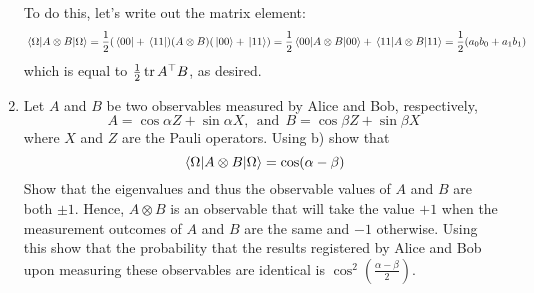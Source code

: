 \documentclass[10pt]{article}
\begin{document}
\begin{enumerate}[label=\alph*)]
			\begin{solution}
				To do this, let's write out the matrix element: 
				\[
					\mel{\Omega}{A \otimes B}{\Omega} = \frac{1}{2}(\bra*{00} + \bra*{11})
					(A \otimes B)(\ket*{00} + \ket*{11}) = 
					\frac{1}{2}\mel{00}{A \otimes B}{00} + \mel{11}{A \otimes B}{11} = \frac{1}{2}(a_0b_0 + a_1b_1)
				\]
				which is equal to \( \frac{1}{2}\tr A^{\top}B \), as desired.  
			\end{solution}
		\item Let \( A \) and \( B \) be two observables measured by Alice and Bob, respectively, 
			\begin{equation}
				\label{AB}
				A = \cos\alpha Z + \sin \alpha X , \ \ \text{and} \ \ B =  \cos \beta Z + \sin \beta X
			\end{equation}
			where \( X \) and \( Z \) are the Pauli operators. Using b) show that 
			\begin{equation}
				\mel{\Omega}{A \otimes B}{\Omega} = \cos(\alpha - \beta)
			\end{equation}
			Show that the eigenvalues and thus the observable values of \( A \) and \( B \) are both \( \pm 1 \). 
			Hence, \( A \otimes B \) is an observable that will take the value \( +1 \) when the measurement outcomes 
			of \( A \) and \( B \) are the same and \( -1 \) otherwise. Using this show that the probability that 
			the results registered by Alice and Bob upon measuring these observables are identical is 
			\( \cos^2(\frac{\alpha - \beta}{2}) \).


\end{enumerate}
\end{document}
